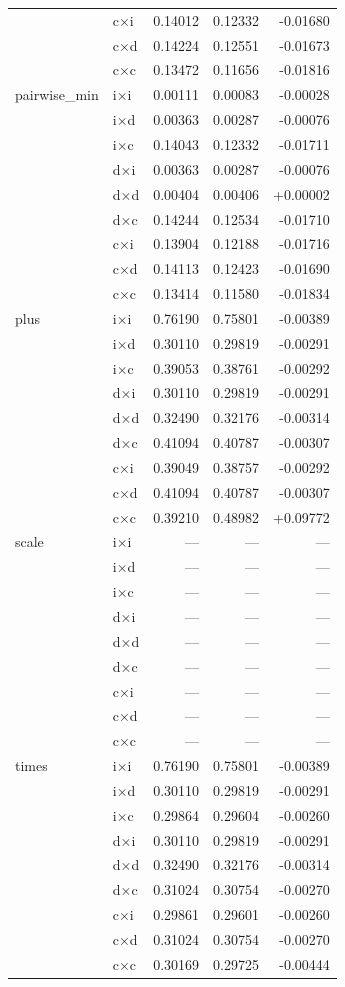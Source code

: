 \begin{longtable}{l l r r r}
   & c×i & 0.14012 & 0.12332 & -0.01680 \\
   & c×d & 0.14224 & 0.12551 & -0.01673 \\
   & c×c & 0.13472 & 0.11656 & -0.01816 \\
\midrule
  pairwise\_min & i×i & 0.00111 & 0.00083 & -0.00028 \\
   & i×d & 0.00363 & 0.00287 & -0.00076 \\
   & i×c & 0.14043 & 0.12332 & -0.01711 \\
   & d×i & 0.00363 & 0.00287 & -0.00076 \\
   & d×d & 0.00404 & 0.00406 & +0.00002 \\
   & d×c & 0.14244 & 0.12534 & -0.01710 \\
   & c×i & 0.13904 & 0.12188 & -0.01716 \\
   & c×d & 0.14113 & 0.12423 & -0.01690 \\
   & c×c & 0.13414 & 0.11580 & -0.01834 \\
\midrule
  plus & i×i & 0.76190 & 0.75801 & -0.00389 \\
   & i×d & 0.30110 & 0.29819 & -0.00291 \\
   & i×c & 0.39053 & 0.38761 & -0.00292 \\
   & d×i & 0.30110 & 0.29819 & -0.00291 \\
   & d×d & 0.32490 & 0.32176 & -0.00314 \\
   & d×c & 0.41094 & 0.40787 & -0.00307 \\
   & c×i & 0.39049 & 0.38757 & -0.00292 \\
   & c×d & 0.41094 & 0.40787 & -0.00307 \\
   & c×c & 0.39210 & 0.48982 & +0.09772 \\
\midrule
  scale & i×i & --- & --- & --- \\
   & i×d & --- & --- & --- \\
   & i×c & --- & --- & --- \\
   & d×i & --- & --- & --- \\
   & d×d & --- & --- & --- \\
   & d×c & --- & --- & --- \\
   & c×i & --- & --- & --- \\
   & c×d & --- & --- & --- \\
   & c×c & --- & --- & --- \\
\midrule
  times & i×i & 0.76190 & 0.75801 & -0.00389 \\
   & i×d & 0.30110 & 0.29819 & -0.00291 \\
   & i×c & 0.29864 & 0.29604 & -0.00260 \\
   & d×i & 0.30110 & 0.29819 & -0.00291 \\
   & d×d & 0.32490 & 0.32176 & -0.00314 \\
   & d×c & 0.31024 & 0.30754 & -0.00270 \\
   & c×i & 0.29861 & 0.29601 & -0.00260 \\
   & c×d & 0.31024 & 0.30754 & -0.00270 \\
   & c×c & 0.30169 & 0.29725 & -0.00444 \\
\midrule
\bottomrule
\end{longtable}
